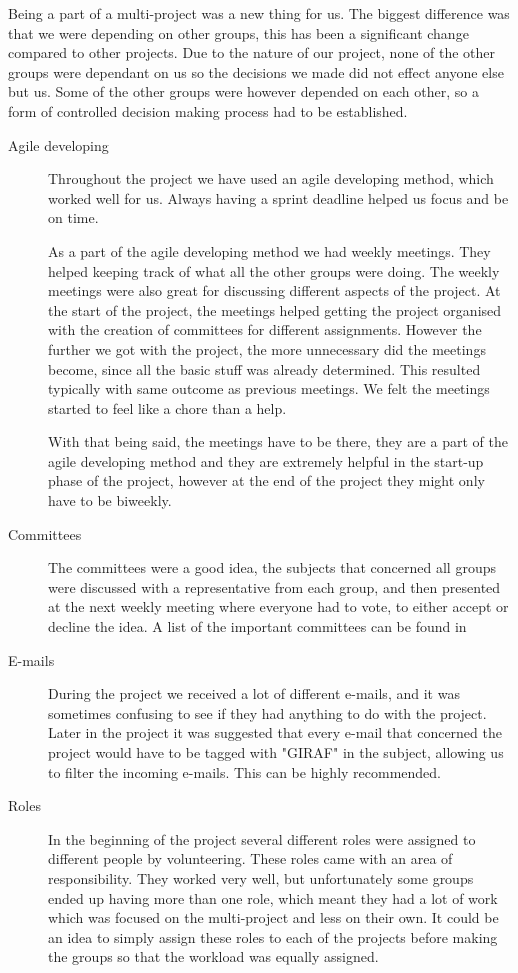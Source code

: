 Being a part of a multi-project was a new thing for us. The biggest difference was that we were depending on other groups, this has been a significant change compared to other projects. Due to the nature of our project, none of the other groups were dependant on us so the decisions we made did not effect anyone else but us. Some of the other groups were however depended on each other, so a form of controlled decision making process had to be established. 

\begin{description}
\item[Agile developing] Throughout the project we have used an agile developing method, which worked well for us. Always having a sprint deadline helped us focus and be on time. 

As a part of the agile developing method we had weekly meetings. They helped keeping track of what all the other groups were doing. The weekly meetings were also great for discussing different aspects of the project. At the start of the project, the meetings helped getting the project organised with the creation of committees for different assignments. However the further we got with the project, the more unnecessary did the meetings become, since all the basic stuff was already determined. This resulted typically with same outcome as previous meetings. We felt the meetings started to feel like a chore than a help. 

With that being said, the meetings have to be there, they are a part of the agile developing method and they are extremely helpful in the start-up phase of the project, however at the end of the project they might only have to be biweekly. 

\item[Committees] The committees were a good idea, the subjects that concerned all groups were discussed with a representative from each group, and then presented at the next weekly meeting where everyone had to vote, to either accept or decline the idea. A list of the important committees can be found in 

\item[E-mails] During the project we received a lot of different e-mails, and it was sometimes confusing to see if they had anything to do with the project. Later in the project it was suggested that every e-mail that concerned the project would have to be tagged with "GIRAF" in the subject, allowing us to filter the incoming e-mails. This can be highly recommended. 

\item[Roles] In the beginning of the project several different roles were assigned to different people by volunteering. These roles came with an area of responsibility. They worked very well, but unfortunately some groups ended up having more than one role, which meant they had a lot of work which was focused on the multi-project and less on their own. It could be an idea to simply assign these roles to each of the projects before making the groups so that the workload was equally assigned. 
\end{description}

